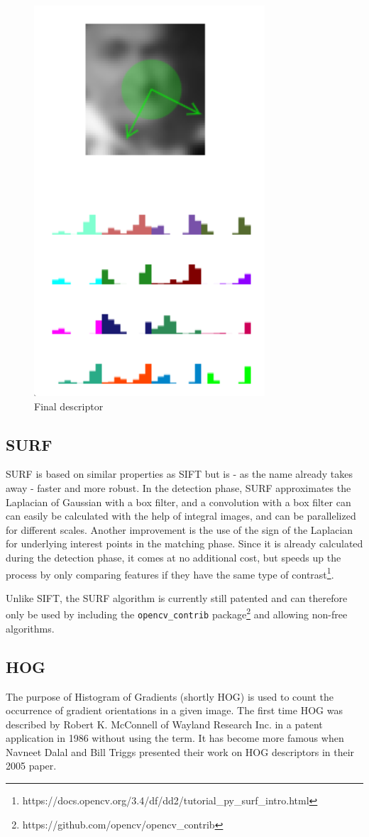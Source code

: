 \documentclass{scrartcl}
\begin{document}
\begin{enumerate}
        \begin{figure}[H]
            \centering
            \includegraphics[width=0.2\linewidth]{img/sift5}
            \caption{Final descriptor}%
            \label{fig:sift5}
        \end{figure}
\end{enumerate}


\subsection{SURF}
SURF is based on similar properties as SIFT but is - as the name already takes away - faster and more robust. In the detection phase, SURF approximates the Laplacian of Gaussian with a box filter, and a convolution with a box filter can can easily be calculated with the help of integral images, and can be parallelized for different scales.
Another improvement is the use of the sign of the Laplacian for underlying interest points in the matching phase. Since it is already calculated during the detection phase, it comes at no additional cost, but speeds up the process by only comparing features if they have the same type of contrast\footnote{https://docs.opencv.org/3.4/df/dd2/tutorial\_py\_surf\_intro.html}.

Unlike SIFT, the SURF algorithm is currently still patented and can therefore only be used by including the \texttt{opencv\_contrib} package\footnote{https://github.com/opencv/opencv\_contrib} and allowing non-free algorithms.

\subsection{HOG}

The purpose of Histogram of Gradients (shortly HOG) is used to count the occurrence of gradient orientations in a given image. The first time HOG was described by Robert K. McConnell of Wayland Research Inc. in a patent application in 1986 without using the term. It has become more famous when Navneet Dalal and Bill Triggs \cite{Hog_article} presented their work on HOG descriptors in their 2005 paper.
\end{document}
